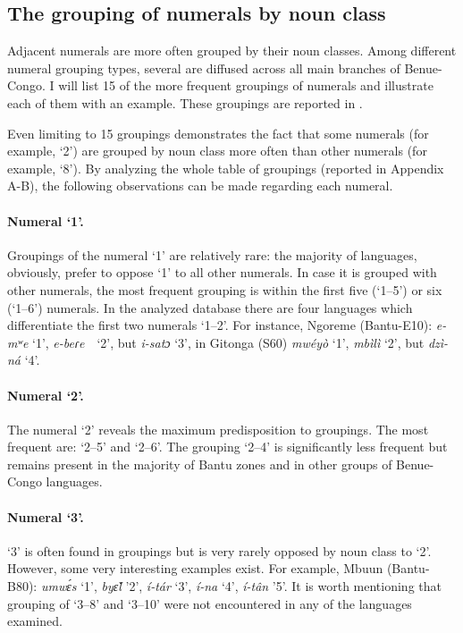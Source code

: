 \subsection{The grouping of numerals by noun class} %
Adjacent numerals are more often grouped by their noun classes. Among different numeral grouping types, several are diffused across all main branches of Benue-Congo. I will list 15 of the more frequent groupings of numerals and illustrate each of them with an example. These groupings are reported in . 

Even limiting  to 15 groupings demonstrates the fact that some numerals (for example, `2') are grouped by noun class more often than other numerals (for example, `8'). By analyzing the whole table of groupings (reported in Appendix A-B), the following observations can be made regarding each numeral. 

\paragraph*{Numeral `1'.} Groupings of the numeral `1' are relatively rare: the majority of languages, obviously, prefer to oppose ‘1’ to all other numerals. In case it is grouped with other numerals, the most frequent grouping is within the first five (‘1--5’) or six (‘1--6’) numerals. In the analyzed database there are four languages which differentiate the first two numerals ‘1--2’. For instance, Ngoreme (Bantu-E10): \textit{e-mʷe} ‘1’, \textit{e-beɾe}~~‘2’, but \textit{i-satɔ} ‘3’, in Gitonga (S60) \textit{mw{\'{e}}yò} ‘1’, \textit{mbìlì} ‘2’, but \textit{dzì-ná} ‘4’. 

\paragraph*{Numeral `2'.} The numeral `2' reveals the maximum predisposition to groupings. The most frequent are: ‘2--5’ and ‘2--6’. The grouping ‘2--4’ is significantly less frequent but remains present in the majority of Bantu zones and in other groups of Benue-Congo languages. 

\paragraph*{Numeral `3'.} `3' is often found in groupings but is very rarely opposed by noun class to `2'. However, some very interesting examples exist. For example, Mbuun (Bantu-B80): \textit{umw{\'{ɛ}}s} ‘1’, \textit{by{\v{ɛ}}l} ’2’, \textit{í-tár} ‘3’, \textit{í-na} ‘4’, \textit{í-tân} ’5’. It is worth mentioning that grouping of ‘3--8’ and ‘3--10’ were not encountered in any of the languages examined. 


